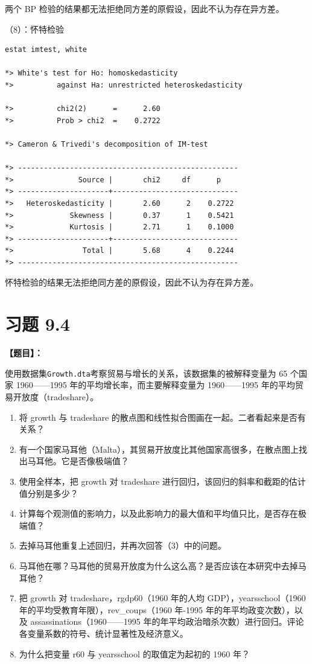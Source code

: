 \documentclass[cn,fancy,blue,11pt]{elegantbook}
\begin{document}
两个 BP 检验的结果都无法拒绝同方差的原假设，因此不认为存在异方差。

（8）：怀特检验

\begin{lstlisting}
estat imtest, white

*> White's test for Ho: homoskedasticity
*>          against Ha: unrestricted heteroskedasticity

*>          chi2(2)      =      2.60
*>          Prob > chi2  =    0.2722

*> Cameron & Trivedi's decomposition of IM-test

*> ---------------------------------------------------
*>               Source |       chi2     df      p
*> ---------------------+-----------------------------
*>   Heteroskedasticity |       2.60      2    0.2722
*>             Skewness |       0.37      1    0.5421
*>             Kurtosis |       2.71      1    0.1000
*> ---------------------+-----------------------------
*>                Total |       5.68      4    0.2244
*> ---------------------------------------------------
\end{lstlisting}

怀特检验的结果无法拒绝同方差的原假设，因此不认为存在异方差。

\hypertarget{section-48}{%
\section{习题 9.4}\label{section-48}}

\textbf{【题目】：}

使用数据集\lstinline{Growth.dta}考察贸易与增长的关系，该数据集的被解释变量为 65 个国家 1960------1995 年的平均增长率，而主要解释变量为 1960------1995 年的平均贸易开放度（tradeshare）。

\begin{enumerate}
\item
  将 growth 与 tradeshare 的散点图和线性拟合图画在一起。二者看起来是否有关系？
\item
  有一个国家马耳他（Malta），其贸易开放度比其他国家高很多，在散点图上找出马耳他。它是否像极端值？
\item
  使用全样本，把 growth 对 tradeshare 进行回归，该回归的斜率和截距的估计值分别是多少？
\item
  计算每个观测值的影响力，以及此影响力的最大值和平均值只比，是否存在极端值？
\item
  去掉马耳他重复上述回归，并再次回答（3）中的问题。
\item
  马耳他在哪？马耳他的贸易开放度为什么这么高？是否应该在本研究中去掉马耳他？
\item
  把 growth 对 tradeshare，rgdp60（1960 年的人均 GDP），yearsschool（1960 年的平均受教育年限），rev\_coups（1960 年-1995 年的年平均政变次数），以及 assassinations（1960------1995 年的年平均政治暗杀次数）进行回归。评论各变量系数的符号、统计显著性及经济意义。
\item
  为什么把变量 r60 与 yearsschool 的取值定为起初的 1960 年？
\end{enumerate}
\end{document}
